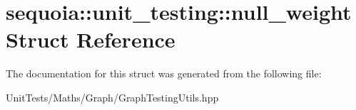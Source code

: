 \hypertarget{structsequoia_1_1unit__testing_1_1null__weight}{}\section{sequoia\+::unit\+\_\+testing\+::null\+\_\+weight Struct Reference}
\label{structsequoia_1_1unit__testing_1_1null__weight}


The documentation for this struct was generated from the following file\+:\begin{DoxyCompactItemize}
\item 
Unit\+Tests/\+Maths/\+Graph/Graph\+Testing\+Utils.\+hpp\end{DoxyCompactItemize}
